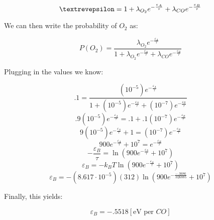 \begin{enumerate}
\begin{enumerate}
        $$\text{\textrevepsilon}=1+\lambda_{O_2}e^{-\frac{\varepsilon_A}{\tau}}+\lambda_{CO}e^{-\frac{\varepsilon_B}{\tau}}$$

        We can then write the probability of $O_2$ as:

        $$P(O_2)=\frac{\lambda_{O_2}e^{-\frac{\varepsilon_A}{\tau}}}{1+\lambda_{O_2}e^{-\frac{\varepsilon_A}{\tau}}+\lambda_{CO}e^{-\frac{\varepsilon_B}{\tau}}}$$

        Plugging in the values we know:

        $$.1=\frac{\left( 10^{-5} \right)e^{-\frac{\varepsilon_A}{\tau}}}{1+\left( 10^{-5} \right)e^{-\frac{\varepsilon_A}{\tau}}+\left( 10^{-7} \right)e^{-\frac{\varepsilon_B}{\tau}}}$$
        $$.9\left( 10^{-5} \right)e^{-\frac{\varepsilon_A}{\tau}}=.1+.1\left( 10^{-7} \right)e^{-\frac{\varepsilon_B}{\tau}}$$
        $$9\left( 10^{-5} \right)e^{-\frac{\varepsilon_A}{\tau}}+1=\left( 10^{-7} \right)e^{-\frac{\varepsilon_B}{\tau}}$$
        $$900e^{-\frac{\varepsilon_A}{\tau}}+10^7=e^{-\frac{\varepsilon_B}{\tau}}$$
        $$-\frac{\varepsilon_B}{\tau}=\ln\left(900e^{-\frac{\varepsilon_A}{\tau}}+10^7\right)$$
        $$\varepsilon_B=-k_BT\ln\left(900e^{-\frac{\varepsilon_A}{\tau}}+10^7\right)$$
        $$\varepsilon_B=-\left( 8.617\cdot10^{-5} \right)(312)\ln\left(900e^{-\frac{-.3686}{.026885}}+10^7\right)$$

        Finally, this yields:

        $$\boxed{\varepsilon_B=-.5518[\si{\eV}\text{ per }CO]}$$

    \end{enumerate}

\end{enumerate}



